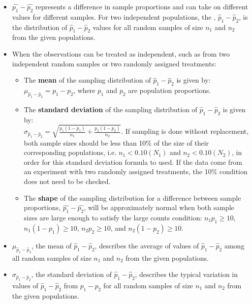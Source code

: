 \begin{itemize} 

\item $\hat{p_1} -\hat{p_2}$ represents a difference in sample proportions and can take on different values for different samples.  For two independent populations, the , $\hat{p}_1 -\hat{p}_2$, is the distribution of $\hat{p}_1 -\hat{p}_2$ values for all random samples of size $n_1$ and $n_2$ from the given populations.

\item When the observations can be treated as independent, such as from two independent random samples or two randomly assigned treatments:

\begin{itemize}
\item The \textbf{mean} of the sampling distribution of $\hat{p}_1 -\hat{p}_2$ is given by:\\
 $\mu_{\hat{p}_1 - \hat{p}_2} = p_1 - p_2$, where $p_1$ and $p_2$ are population proportions.

\item The \textbf{standard deviation} of the sampling distribution of $\hat{p}_1 -\hat{p}_2$ is given by: 
\\$\sigma_{\hat{p}_1 - \hat{p}_2} =  \sqrt{\frac{p_1(1-p_1)}{n_1} + \frac{p_2(1-p_2)}{n_2}}$.  If sampling is done without replacement, both sample sizes should be less than 10\% of the size of their corresponding populations, i.e. $n_1<0.10(N_1)$ and $n_2<0.10(N_2)$, in order for this standard deviation formula to used.  If the data come from an experiment with two randomly assigned treatments, the 10\% condition does not need to be checked.

\item The \textbf{shape} of the sampling distribution for a difference between sample proportions, $\hat{p_1} -\hat{p_2}$, will be approximately normal when both sample sizes are large enough to satisfy the large counts condition: $n_1p_1 \ge 10$, $n_1(1-p_1)\ge10$, $n_2p_2 \ge 10$, and $n_2(1-p_2)\ge10$.
\end{itemize}

\item $\mu_{\hat{p}_1 - \hat{p}_2}$, the mean of $\hat{p}_1 -\hat{p}_2$, describes the average of values of $\hat{p}_1 -\hat{p}_2$ among all random samples of size $n_1$ and $n_2$ from the given populations.  

\item $\sigma_{\hat{p}_1 - \hat{p}_2}$, the standard deviation of $\hat{p}_1 -\hat{p}_2$, describes the typical variation in values of $\hat{p}_1 -\hat{p}_2$ from $p_1-p_2$ for all random samples of size $n_1$ and $n_2$ from the given populations.  


\end{itemize}
